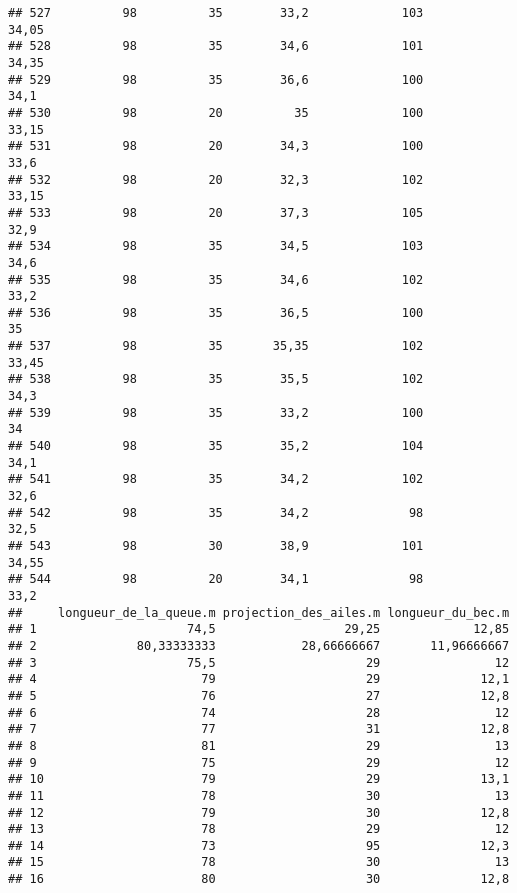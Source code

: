 \documentclass[
]{article}
\begin{document}
\begin{verbatim}
## 527          98          35        33,2             103                34,05
## 528          98          35        34,6             101                34,35
## 529          98          35        36,6             100                 34,1
## 530          98          20          35             100                33,15
## 531          98          20        34,3             100                 33,6
## 532          98          20        32,3             102                33,15
## 533          98          20        37,3             105                 32,9
## 534          98          35        34,5             103                 34,6
## 535          98          35        34,6             102                 33,2
## 536          98          35        36,5             100                   35
## 537          98          35       35,35             102                33,45
## 538          98          35        35,5             102                 34,3
## 539          98          35        33,2             100                   34
## 540          98          35        35,2             104                 34,1
## 541          98          35        34,2             102                 32,6
## 542          98          35        34,2              98                 32,5
## 543          98          30        38,9             101                34,55
## 544          98          20        34,1              98                 33,2
##     longueur_de_la_queue.m projection_des_ailes.m longueur_du_bec.m
## 1                     74,5                  29,25             12,85
## 2              80,33333333            28,66666667       11,96666667
## 3                     75,5                     29                12
## 4                       79                     29              12,1
## 5                       76                     27              12,8
## 6                       74                     28                12
## 7                       77                     31              12,8
## 8                       81                     29                13
## 9                       75                     29                12
## 10                      79                     29              13,1
## 11                      78                     30                13
## 12                      79                     30              12,8
## 13                      78                     29                12
## 14                      73                     95              12,3
## 15                      78                     30                13
## 16                      80                     30              12,8

\end{verbatim}
\end{document}
